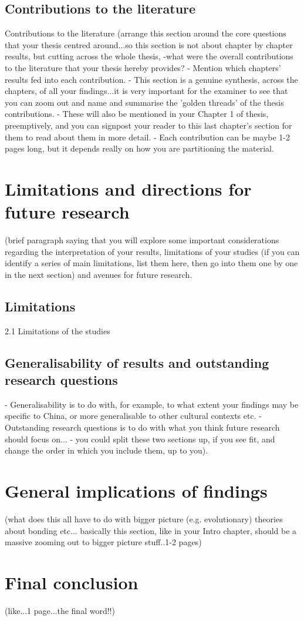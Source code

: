   \subsection{Contributions to the literature}
Contributions to the literature (arrange this section around the core questions that your thesis centred around...so this section is not about chapter by chapter results, but cutting across the whole thesis,
    -what were the overall contributions to the literature that your thesis hereby provides?
    - Mention which chapters' results fed into each contribution.
    - This section is a genuine synthesis, across the chapters, of all your findings...it is very important for the examiner to see that you can zoom out and name and summarise the 'golden threads' of the thesis contributions.
    - These will also be mentioned in your Chapter 1 of thesis, preemptively, and you can signpost your reader to this last chapter's section for them to read about them in more detail.
    - Each contribution can be maybe 1-2 pages long, but it depends really on how you are partitioning the material.

\section{Limitations and directions for future research}


(brief paragraph saying that you will explore some important considerations regarding the interpretation of your results, limitations of your studies (if you can identify a series of main limitations, list them here, then go into them one by one in the next section) and avenues for future research.

\subsection{Limitations}
2.1 Limitations of the studies

\subsection{Generalisability of results and outstanding research questions}
 - Generalisability is to do with, for example, to what extent your findings may be specific to China, or more generalisable to other cultural contexts etc.
 - Outstanding research questions is to do with what you think future research should focus on...
 - you could split these two sections up, if you see fit, and change the order in which you include them, up to you).

\section{General implications of findings}
(what does this all have to do with bigger picture (e.g. evolutionary) theories about bonding etc... basically this section, like in your Intro chapter, should be a massive zooming out to bigger picture stuff..1-2 pages)

\section{Final conclusion}
 (like...1 page...the final word!!)
